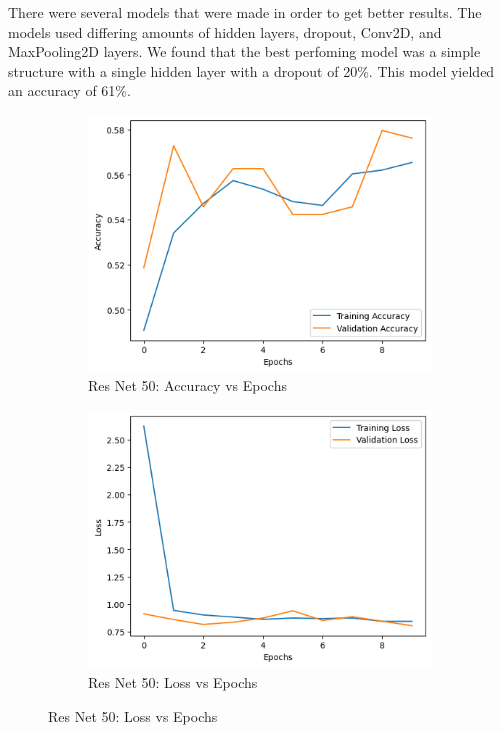 There were several models that were made in order to get better results.
The models used differing amounts of hidden layers, dropout, Conv2D, and MaxPooling2D layers.
We found that the best perfoming model was a simple structure with a single hidden layer with a dropout of 20\%.
This model yielded an accuracy of 61\%.

\begin{figure}[h]
    \begin{subfigure}{0.4\textwidth}
        \centering
        \includegraphics[scale=0.5]{resnet50_acc}
        \caption{Res Net 50: Accuracy vs Epochs}
        \label{fig:figure3}
    \end{subfigure}
    \hspace{0.2\textwidth}
    \begin{subfigure}{0.4\textwidth}
        \centering
        \includegraphics[scale=0.5]{resnet50loss}
        \caption{Res Net 50: Loss vs Epochs}
        \label{fig:figure3}
    \end{subfigure}
\end{figure}

